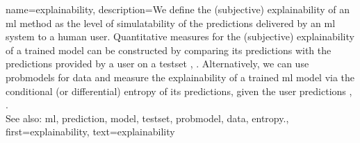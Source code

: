 {name={explainability},
	description={We define the (subjective) explainability of an \gls{ml} method 
		as the level of simulatability \cite{Colin:2022aa} of the \glspl{prediction} 
		delivered by an \gls{ml} system to a human user. Quantitative measures for the 
		(subjective) explainability of a trained \gls{model} can be constructed by 
		comparing its \glspl{prediction} with the \glspl{prediction} provided by a user 
		on a \gls{testset} \cite{Colin:2022aa}, \cite{Zhang:2024aa}. Alternatively, we can use 
		\glspl{probmodel} for \gls{data} and measure the explainability of a trained \gls{ml} 
		\gls{model} via the conditional (or differential) \gls{entropy} of its \glspl{prediction}, given the user \glspl{prediction} \cite{JunXML2020}, \cite{Chen2018}.
						\\ 
		See also: \gls{ml}, \gls{prediction}, \gls{model}, \gls{testset}, \gls{probmodel}, \gls{data}, \gls{entropy}.},
	first={explainability},
	text={explainability}
}

